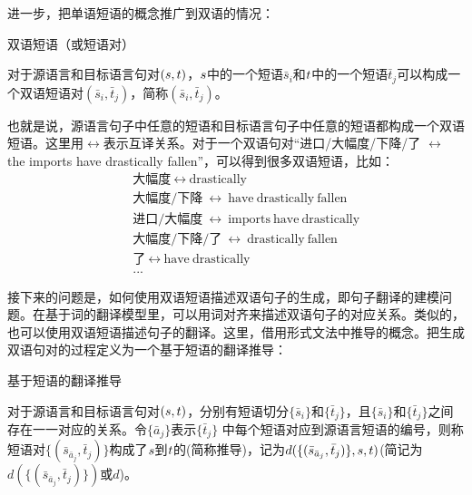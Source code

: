 \parinterval 进一步，把单语短语的概念推广到双语的情况：

\vspace{0.5em}
\begin{definition} 双语短语（或短语对）

{\small
对于源语言和目标语言句对$({s},{t})$，${s}$中的一个短语$\bar{s}_i$和${t}$中的一个短语$\bar{t}_j$可以构成一个双语短语对$(\bar{s}_i,\bar{t}_j)$，简称{\small{}}$(\bar{s}_i,\bar{t}_j)$。
}
\end{definition}

\parinterval 也就是说，源语言句子中任意的短语和目标语言句子中任意的短语都构成一个双语短语。这里用$\leftrightarrow$表示互译关系。对于一个双语句对“进口/大幅度/下降/了 $\leftrightarrow$ the imports have drastically fallen”，可以得到很多双语短语，比如：
\begin{eqnarray}
&&\text{大幅度}\ \leftrightarrow\ \textrm{drastically} \nonumber \\
&&\text{大幅度}/\text{下降}\ \leftrightarrow\ \textrm{have}\ \textrm{drastically}\ \textrm{fallen} \nonumber \\
&&\text{进口}/\text{大幅度}\ \leftrightarrow\ \textrm{imports}\ \textrm{have}\ \textrm{drastically} \nonumber \\
&&\text{大幅度}/\text{下降}/\text{了}\ \leftrightarrow\ \textrm{drastically}\ \textrm{fallen} \nonumber \\
&&\text{了}\ \leftrightarrow\ \textrm{have}\ \textrm{drastically} \nonumber \\
&&... \nonumber
\end{eqnarray}

\parinterval 接下来的问题是，如何使用双语短语描述双语句子的生成，即句子翻译的建模问题。在基于词的翻译模型里，可以用词对齐来描述双语句子的对应关系。类似的，也可以使用双语短语描述句子的翻译。这里，借用形式文法中推导的概念。把生成双语句对的过程定义为一个基于短语的翻译推导：

\vspace{0.5em}
\begin{definition} 基于短语的翻译推导

{\small
对于源语言和目标语言句对$({s},{t})$，分别有短语切分$\{\bar{s}_i\}$和$\{\bar{t}_j\}$，且$\{\bar{s}_i\}$和$\{\bar{t}_j\}$之间存在一一对应的关系。令$\{\bar{a}_j\}$表示$\{\bar{t}_j\}$ 中每个短语对应到源语言短语的编号，则称短语对$\{(\bar{s}_{\bar{a}_j},\bar{t}_j)\}$构成了${s}$到${t}$的{\small{}}(简称推导)，记为$d(\{(\bar{s}_{\bar{a}_j},\bar{t}_j)\},{s},{t})$(简记为$d(\{(\bar{s}_{\bar{a}_j},\bar{t}_j)\})$或$d$)。
}
\end{definition}

